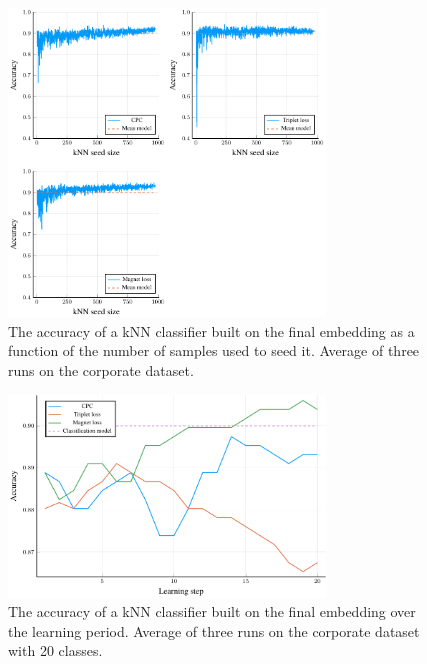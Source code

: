 \begin{figure}
  \centering
  \includegraphics[width=0.75\textwidth]{images/cisco/kNN/cisco-kNN.pdf}
  \caption{The accuracy of a kNN classifier built on the final embedding as a function of the number of samples used to seed it. Average of three runs on the corporate dataset.}\label{fig:cisco-kNN}
\end{figure}

\begin{figure}
  \centering
  \includegraphics[width=0.75\textwidth]{images/cisco-multiclass/accuracy/cisco-multiclass-accuracy.pdf}
  \caption{The accuracy of a kNN classifier built on the final embedding over the learning period. Average of three runs on the corporate dataset with 20 classes.}\label{fig:cisco-multiclass-accuracy}
\end{figure}

